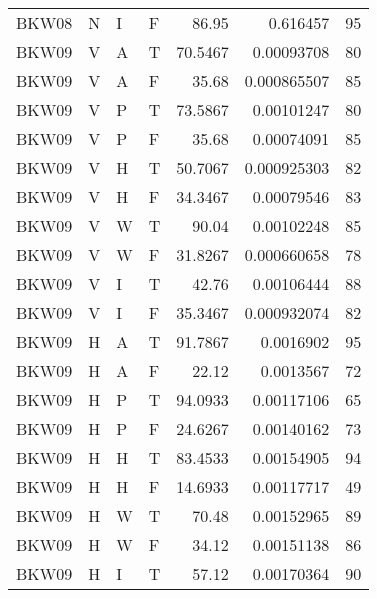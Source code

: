 \begin{longtable}{llllrrr}
    BKW08    & N         & I         & F          & 86.95      & 0.616457    & 95       \\
    BKW09    & V         & A         & T          & 70.5467    & 0.00093708  & 80       \\
    BKW09    & V         & A         & F          & 35.68      & 0.000865507 & 85       \\
    BKW09    & V         & P         & T          & 73.5867    & 0.00101247  & 80       \\
    BKW09    & V         & P         & F          & 35.68      & 0.00074091  & 85       \\
    BKW09    & V         & H         & T          & 50.7067    & 0.000925303 & 82       \\
    BKW09    & V         & H         & F          & 34.3467    & 0.00079546  & 83       \\
    BKW09    & V         & W         & T          & 90.04      & 0.00102248  & 85       \\
    BKW09    & V         & W         & F          & 31.8267    & 0.000660658 & 78       \\
    BKW09    & V         & I         & T          & 42.76      & 0.00106444  & 88       \\
    BKW09    & V         & I         & F          & 35.3467    & 0.000932074 & 82       \\
    BKW09    & H         & A         & T          & 91.7867    & 0.0016902   & 95       \\
    BKW09    & H         & A         & F          & 22.12      & 0.0013567   & 72       \\
    BKW09    & H         & P         & T          & 94.0933    & 0.00117106  & 65       \\
    BKW09    & H         & P         & F          & 24.6267    & 0.00140162  & 73       \\
    BKW09    & H         & H         & T          & 83.4533    & 0.00154905  & 94       \\
    BKW09    & H         & H         & F          & 14.6933    & 0.00117717  & 49       \\
    BKW09    & H         & W         & T          & 70.48      & 0.00152965  & 89       \\
    BKW09    & H         & W         & F          & 34.12      & 0.00151138  & 86       \\
    BKW09    & H         & I         & T          & 57.12      & 0.00170364  & 90       \\

\end{longtable}
